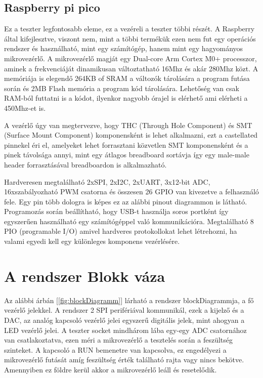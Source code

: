 \subsection{Raspberry pi pico}

Ez a teszter legfontosabb eleme, ez a vezéreli a teszter többi részét. A Raspberry 
által kifejlesztve, viszont nem, mint a többi termékük ezen nem fut egy operációs 
rendszer és használható, mint egy számítógép, hanem mint egy hagyományos 
mikrovezérlő. A mikrovezérlő magját egy Dual-core Arm Cortex M0+ processzor, 
aminek a frekvenciáját dinamikusan változtatható 16Mhz és akár 280Mhz közt. A 
memóriája is elegendő 264KB of SRAM a változók tárolására a program futása során 
és 2MB Flash memória a program kód tárolására. Lehetőség van csak RAM-ból futtatni 
is a kódot, ilyenkor nagyobb órajel is elérhető ami elérheti a 450Mhz-et is.

A vezérlő úgy van megtervezve, hogy THC (Through Hole Component) és SMT 
(Surface Mount Component) komponensként is lehet alkalmazni, 
ezt a castellated pinnekel éri el, amelyeket lehet forrasztani közvetlen SMT 
komponensként és a pinek távolsága annyi, mint egy átlagos breadboard sortávja így 
egy male-male header forrasztásával breadboardon is alkalmazható. 

Hardveresen 
megtalálható 2xSPI, 2xI2C, 2xUART, 3x12-bit ADC, 16xszabályozható PWM csatorna és 
összesen 26 GPIO van kivezetve a felhasználó fele. Egy pin több dologra is képes 
ez az alábbi pinout diagrammon is látható. Programozás során beállítható, hogy 
USB-t használja soros portként így egyszerűen használható egy számítógéppel való 
kommunikációra. Megtalálható 8 PIO (programable I/O) amivel hardveres protokollokat 
lehet létrehozni, ha valami egyedi kell egy különleges komponens vezérlésére. 


\section{A rendszer Blokk váza}

Az alábbi árbán [\ref{fig:blockDiagramm}] lárható a rendszer blockDiagrammja, a fő vezérlő jelekkel.
A rendszer 2 SPI perifériával kommunikál, ezek a kijelző és a DAC, az analóg kapcsoló vezérlő jelei 
egyszerű digitális jelek, mint ahogyan a LED vezérlő jelei. A teszter socket mindhárom lába egy-egy ADC
csatornához van csatlakoztatva, ezen méri a mikrovezérlő a tesztelés során a feszültség szinteket.
A kapcsoló a RUN bemenetre van kapcsolva, ez engedélyezi a mikrovezérlő futását amíg feszültség érték 
található rajta vagy nincs bekötve. Amennyiben ez földre kerül akkor a mikrovezérlő leáll és resetelődik.

